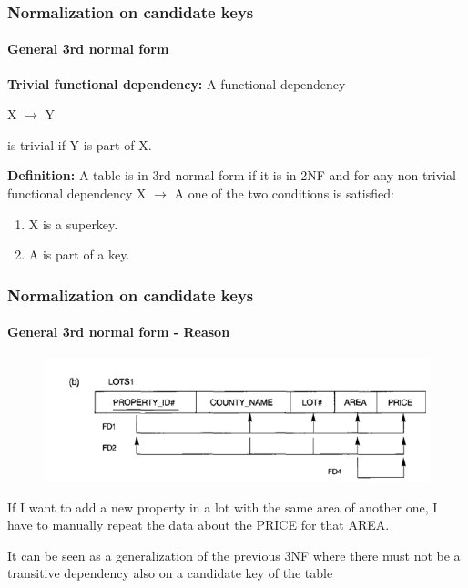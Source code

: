 \documentclass{beamer}
\newcommand{\fdep}[2]{#1 $\rightarrow$ #2}
\begin{document}
\begin{frame}
	\frametitle{Normalization on candidate keys}
	\framesubtitle{General 3rd normal form}
	
	\textbf{Trivial functional dependency:}
	A functional dependency 
	
	\fdep{X}{Y} 
	
	is trivial if Y is part of X.
	
	\textbf{Definition:}
	A table is in 3rd normal form if it is in 2NF and for any non-trivial functional dependency \fdep{X}{A} one of the two conditions is satisfied:
	\begin{enumerate}
		\item X is a superkey.
		\item A is part of a key.
	\end{enumerate}
\end{frame}

\begin{frame}
	\frametitle{Normalization on candidate keys}
	\framesubtitle{General 3rd normal form - Reason}
	
	\begin{figure}
		\includegraphics[scale=0.4]{img/normalization/norm13}
	\end{figure}
	
	If I want to add a new property in a lot with the same area of another one, I have to manually repeat the data about the PRICE for that AREA.
	
	It can be seen as a generalization of the previous 3NF where there must not be a transitive dependency also on a candidate key of the table
		
\end{frame}
\end{document}
